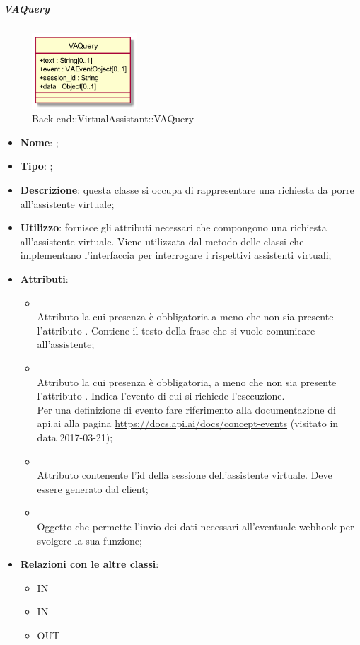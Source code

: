 \hypertarget{VAQuery_label}{\subparagraph{VAQuery}}
\begin{figure}[h]
	\centering
	\includegraphics[width=0.35\textwidth,height=\textheight,keepaspectratio]{images/ClassVAQuery.png}
	\caption{Back-end::VirtualAssistant::VAQuery}
\end{figure}
\begin{itemize}
	\item \textbf{Nome}: ;
	\item \textbf{Tipo}: ;
	\item \textbf{Descrizione}: questa classe si occupa di rappresentare una richiesta da porre all'assistente virtuale;
	\item \textbf{Utilizzo}: fornisce gli attributi necessari che compongono una richiesta all'assistente virtuale. Viene utilizzata dal metodo  delle classi che implementano l'interfaccia  per interrogare i rispettivi assistenti virtuali;
	\item \textbf{Attributi}:
	\begin{itemize}
		\item[]  \\
		Attributo la cui presenza è obbligatoria a meno che non sia presente l'attributo . Contiene il testo della frase che si vuole comunicare all'assistente;
		\item[]  \\
		Attributo la cui presenza è obbligatoria, a meno che non sia presente l'attributo . Indica l'evento di cui si richiede l'esecuzione. \\ Per una definizione di evento fare riferimento alla documentazione di api.ai alla pagina \url{https://docs.api.ai/docs/concept-events} (visitato in data 2017-03-21);
		\item[]  \\
		Attributo contenente l'id della sessione dell'assistente virtuale. Deve essere generato dal client;
		\item[]  \\
		Oggetto che permette l'invio dei dati necessari all'eventuale webhook per svolgere la sua funzione;
	\end{itemize}
	\item \textbf{Relazioni con le altre classi}:
	\begin{itemize}
		\item IN \hyperlink{<<interface>> VAModule_label}{}
		\item IN \hyperlink{ApiAiVAAdapter_label}{}
		\item OUT \hyperlink{VAEventObject_label}{}
	\end{itemize}
\end{itemize}
